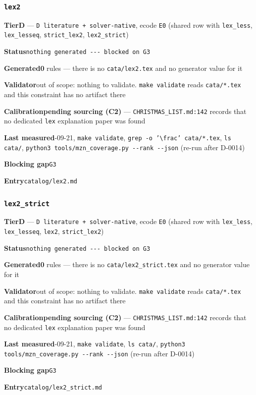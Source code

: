 \documentclass[10pt,a4paper]{article}
\newcommand{\entryfield}[2]{{\raggedright\textbf{#1}\quad #2\par}}
\begin{document}
\subsubsection*{\texttt{lex2}}
\label{entry:lex2}
\entryfield{Tier}{\textbf{D} --- \texttt{D literature + solver-\allowbreak{}native}, ecode \texttt{E0} (shared row with \texttt{lex\_less}, \texttt{lex\_lesseq}, \texttt{strict\_lex2}, \texttt{lex2\_strict})}
\entryfield{Status}{\texttt{nothing generated -\allowbreak{}-\allowbreak{}-\allowbreak{} blocked on G3}}
\entryfield{Generated}{\textbf{0} rules --- there is no \texttt{cata/lex2.tex} and no generator value for it}
\entryfield{Validator}{out of scope: nothing to validate. \texttt{make validate} reads \texttt{cata/*.tex} and this constraint has no artifact there}
\entryfield{Calibration}{\textbf{pending sourcing (C2)} --- \texttt{CHRISTMAS\_LIST.md:142} records that no dedicated \texttt{lex} explanation paper was found}
\entryfield{Last measured}{2026-09-21, \texttt{make validate}, \texttt{grep -\allowbreak{}o '\textbackslash{}frac' cata/\allowbreak{}*.\allowbreak{}tex}, \texttt{ls cata/}, \texttt{python3 tools/\allowbreak{}mzn\_\allowbreak{}coverage.\allowbreak{}py -\allowbreak{}-\allowbreak{}rank -\allowbreak{}-\allowbreak{}json} (re-run after D-0014)}
\entryfield{Blocking gap}{\texttt{G3}}
\entryfield{Entry}{\texttt{catalog/lex2.md}}
\subsubsection*{\texttt{lex2\_\allowbreak{}strict}}
\label{entry:lex2-strict}
\entryfield{Tier}{\textbf{D} --- \texttt{D literature + solver-\allowbreak{}native}, ecode \texttt{E0} (shared row with \texttt{lex\_less}, \texttt{lex\_lesseq}, \texttt{lex2}, \texttt{strict\_lex2})}
\entryfield{Status}{\texttt{nothing generated -\allowbreak{}-\allowbreak{}-\allowbreak{} blocked on G3}}
\entryfield{Generated}{\textbf{0} rules --- there is no \texttt{cata/lex2\_strict.tex} and no generator value for it}
\entryfield{Validator}{out of scope: nothing to validate. \texttt{make validate} reads \texttt{cata/*.tex} and this constraint has no artifact there}
\entryfield{Calibration}{\textbf{pending sourcing (C2)} --- \texttt{CHRISTMAS\_LIST.md:142} records that no dedicated \texttt{lex} explanation paper was found}
\entryfield{Last measured}{2026-09-21, \texttt{make validate}, \texttt{ls cata/}, \texttt{python3 tools/\allowbreak{}mzn\_\allowbreak{}coverage.\allowbreak{}py -\allowbreak{}-\allowbreak{}rank -\allowbreak{}-\allowbreak{}json} (re-run after D-0014)}
\entryfield{Blocking gap}{\texttt{G3}}
\entryfield{Entry}{\texttt{catalog/lex2\_strict.md}}
\end{document}
